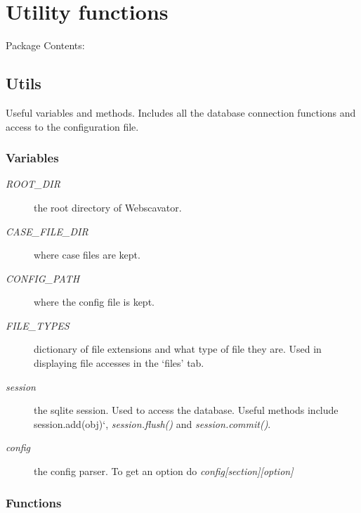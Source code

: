 \documentclass[letterpaper,10pt,english]{manual}
\begin{document}
\resetcurrentobjects
\hypertarget{--doc-utilities}{}

\section{Utility functions}

Package Contents:

\resetcurrentobjects
\hypertarget{--doc-utils}{}

\subsection{Utils}
\hypertarget{module-webscavator.utils.utils}{}
\modulesynopsis{}
Useful variables and methods. Includes all the database connection functions and access to the 
configuration file.


\subsubsection{Variables}
\begin{description}
\item[\emph{ROOT\_DIR}]
the root directory of Webscavator.

\item[\emph{CASE\_FILE\_DIR}]
where case files are kept.

\item[\emph{CONFIG\_PATH}]
where the config file is kept.

\item[\emph{FILE\_TYPES}]
dictionary of file extensions and what type of file they are. Used in 
displaying file accesses in the `files' tab.

\item[\emph{session}]
the sqlite session. Used to access the database. Useful methods include  
session.add(obj){}`, \emph{session.flush()} and \emph{session.commit()}.

\item[\emph{config}]
the config parser. To get an option do \emph{config{[}section{]}{[}option{]}}

\end{description}


\subsubsection{Functions}
\end{document}
